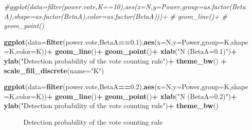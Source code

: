 \documentclass[]{book}
\newenvironment{Shaded}{\begin{snugshade}}{\end{snugshade}}
\newcommand{\CommentTok}[1]{\textcolor[rgb]{0.56,0.35,0.01}{\textit{#1}}}
\newcommand{\DataTypeTok}[1]{\textcolor[rgb]{0.13,0.29,0.53}{#1}}
\newcommand{\FloatTok}[1]{\textcolor[rgb]{0.00,0.00,0.81}{#1}}
\newcommand{\KeywordTok}[1]{\textcolor[rgb]{0.13,0.29,0.53}{\textbf{#1}}}
\newcommand{\NormalTok}[1]{#1}
\newcommand{\OperatorTok}[1]{\textcolor[rgb]{0.81,0.36,0.00}{\textbf{#1}}}
\newcommand{\StringTok}[1]{\textcolor[rgb]{0.31,0.60,0.02}{#1}}
\theoremstyle{definition}
\theoremstyle{definition}
\theoremstyle{definition}
\theoremstyle{remark}
\begin{document}
\begin{Shaded}
\begin{Highlighting}[]
\CommentTok{#ggplot(data=filter(power.vote,K==10),aes(x=N,y=Power,group=as.factor(BetaA),shape=as.factor(BetaA),color=as.factor(BetaA)))+}
\CommentTok{#  geom_line()+}
\CommentTok{#  geom_point()}

\KeywordTok{ggplot}\NormalTok{(}\DataTypeTok{data=}\KeywordTok{filter}\NormalTok{(power.vote,BetaA}\OperatorTok{==}\FloatTok{0.1}\NormalTok{),}\KeywordTok{aes}\NormalTok{(}\DataTypeTok{x=}\NormalTok{N,}\DataTypeTok{y=}\NormalTok{Power,}\DataTypeTok{group=}\NormalTok{K,}\DataTypeTok{shape=}\NormalTok{K,}\DataTypeTok{color=}\NormalTok{K))}\OperatorTok{+}
\StringTok{  }\KeywordTok{geom_line}\NormalTok{()}\OperatorTok{+}
\StringTok{  }\KeywordTok{geom_point}\NormalTok{()}\OperatorTok{+}
\StringTok{  }\KeywordTok{xlab}\NormalTok{(}\StringTok{"N (BetaA=0.1)"}\NormalTok{)}\OperatorTok{+}
\StringTok{  }\KeywordTok{ylab}\NormalTok{(}\StringTok{"Detection probability of the vote counting rule"}\NormalTok{)}\OperatorTok{+}
\StringTok{  }\KeywordTok{theme_bw}\NormalTok{() }\OperatorTok{+}\StringTok{ }
\StringTok{  }\KeywordTok{scale_fill_discrete}\NormalTok{(}\DataTypeTok{name=}\StringTok{"K"}\NormalTok{)}


\KeywordTok{ggplot}\NormalTok{(}\DataTypeTok{data=}\KeywordTok{filter}\NormalTok{(power.vote,BetaA}\OperatorTok{==}\FloatTok{0.2}\NormalTok{),}\KeywordTok{aes}\NormalTok{(}\DataTypeTok{x=}\NormalTok{N,}\DataTypeTok{y=}\NormalTok{Power,}\DataTypeTok{group=}\NormalTok{K,}\DataTypeTok{shape=}\NormalTok{K,}\DataTypeTok{color=}\NormalTok{K))}\OperatorTok{+}
\StringTok{  }\KeywordTok{geom_line}\NormalTok{()}\OperatorTok{+}
\StringTok{  }\KeywordTok{geom_point}\NormalTok{()}\OperatorTok{+}
\StringTok{  }\KeywordTok{xlab}\NormalTok{(}\StringTok{"N (BetaA=0.2)"}\NormalTok{)}\OperatorTok{+}
\StringTok{  }\KeywordTok{ylab}\NormalTok{(}\StringTok{"Detection probability of the vote counting rule"}\NormalTok{)}\OperatorTok{+}
\StringTok{  }\KeywordTok{theme_bw}\NormalTok{()}
\end{Highlighting}
\end{Shaded}

\begin{figure}[htbp]

{\centering {}

}

\caption{Detection probability of the vote counting rule}\label{fig:VoteCounting}
\end{figure}
\end{document}
